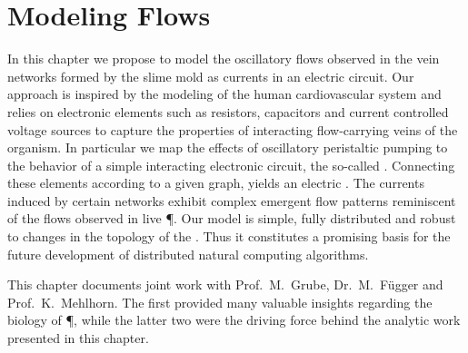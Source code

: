 \chapter{Modeling Flows}\label{chap:model}

	In this chapter we propose to model the oscillatory flows observed in the vein networks formed by the slime mold \Pp as currents in an electric circuit. Our approach is inspired by the modeling of the human cardiovascular system and relies on electronic elements such as resistors, capacitors and current controlled voltage sources to capture the properties of interacting flow-carrying veins of the organism. In particular we map the effects of oscillatory peristaltic pumping to the behavior of a simple interacting electronic circuit, the so-called \Pe. Connecting these elements according to a given graph, yields an electric \Pn. The currents induced by certain networks exhibit complex emergent flow patterns reminiscent of the flows observed in live \P. Our model is simple, fully distributed and robust to changes in the topology of the \Pn. Thus it constitutes a promising basis for the future development of distributed natural computing algorithms.

	This chapter documents joint work with Prof.~M.~Grube, Dr.~M.~F\"ugger and Prof.~K.~Mehlhorn. The first provided many valuable insights regarding the biology of \P, while the latter two were the driving force behind the analytic work presented in this chapter.

	
	
	
	
	
	

